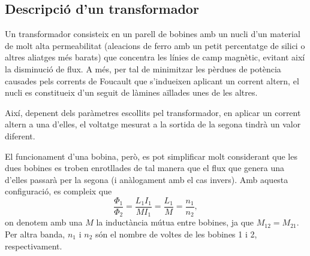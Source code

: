 \documentclass[a4paper,10.5pt]{report}
\begin{document}
\subsection{Descripció d'un transformador}
Un transformador consisteix en un parell de bobines amb un nucli d'un material de molt alta permeabilitat (aleacions de ferro amb un petit percentatge de silici o altres aliatges més barats) que concentra les línies de camp magnètic, evitant així la disminució de flux. A més, per tal de minimitzar les pèrdues de potència causades pels corrents de Foucault que s'indueixen aplicant un corrent altern, el nucli es constitueix d'un seguit de làmines aïllades unes de les altres. 

Així, depenent dels paràmetres escollits pel transformador, en aplicar un corrent altern a una d'elles, el voltatge mesurat a la sortida de la segona tindrà un valor diferent.

El funcionament d'una bobina, però, es pot simplificar molt considerant que les dues bobines es troben enrotllades de tal manera que el flux que genera una d'elles passarà per la segona (i anàlogament amb el cas invers). Amb aquesta configuració, es compleix que
\begin{equation}
	\frac{\Phi_1}{\Phi_2}=\frac{L_1I_1}{MI_1}=\frac{L_1}{M}=\frac{n_1}{n_2}, \label{eq:4:8}
\end{equation}
on denotem amb una $M$ la inductància mútua entre bobines, ja que $M_{12}=M_{21}$. Per altra banda, $n_1$ i $n_2$ són el nombre de voltes de les bobines 1 i 2, respectivament.
\end{document}
